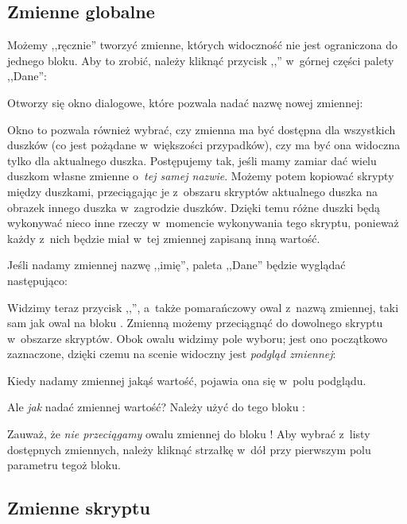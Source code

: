 \documentclass[a4paper]{report}
\begin{document}
\subsection{Zmienne globalne}

Możemy ,,ręcznie'' tworzyć zmienne, których widoczność nie jest ograniczona do jednego bloku. Aby to zrobić, należy kliknąć przycisk ,,'' w~górnej części palety ,,Dane'':\nopagebreak


Otworzy się okno dialogowe, które pozwala nadać nazwę nowej zmiennej:\nopagebreak


Okno to pozwala również wybrać, czy zmienna ma być dostępna dla wszystkich duszków (co jest pożądane w~większości przypadków), czy ma być ona widoczna tylko dla aktualnego duszka. Postępujemy tak, jeśli mamy zamiar dać wielu duszkom własne zmienne o~\emph{tej samej nazwie}. Możemy potem kopiować skrypty między duszkami, przeciągając je z~obszaru skryptów aktualnego duszka na obrazek innego duszka w~zagrodzie duszków. Dzięki temu różne duszki będą wykonywać nieco inne rzeczy w~momencie wykonywania tego skryptu, ponieważ każdy z~nich będzie miał w~tej zmiennej zapisaną inną wartość.

Jeśli nadamy zmiennej nazwę ,,imię'', paleta ,,Dane'' będzie wyglądać następująco:\nopagebreak


Widzimy teraz przycisk ,,'', a~także pomarańczowy owal z~nazwą zmiennej, taki sam jak owal na bloku . Zmienną możemy przeciągnąć do dowolnego skryptu w~obszarze skryptów. Obok owalu widzimy pole wyboru; jest ono początkowo zaznaczone, dzięki czemu na scenie widoczny jest \emph{podgląd zmiennej}:\nopagebreak


Kiedy nadamy zmiennej jakąś wartość, pojawia ona się w~polu podglądu.

Ale \emph{jak} nadać zmiennej wartość? Należy użyć do tego bloku :\nopagebreak


Zauważ, że \emph{nie przeciągamy} owalu zmiennej do bloku ! Aby wybrać z~listy dostępnych zmiennych, należy kliknąć strzałkę w~dół przy pierwszym polu parametru tegoż bloku.

\subsection{Zmienne skryptu}
\end{document}
